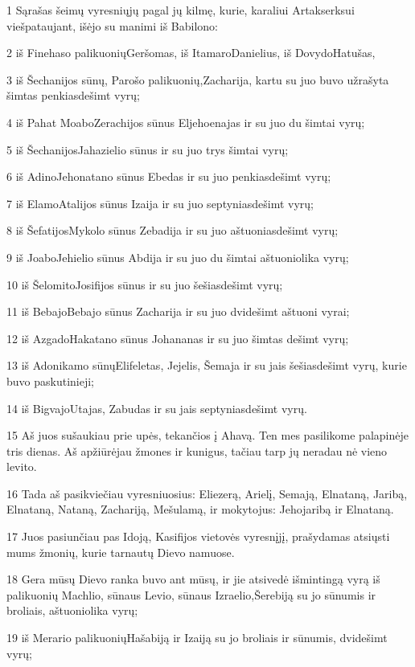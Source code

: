 \par 1 Sąrašas šeimų vyresniųjų pagal jų kilmę, kurie, karaliui Artakserksui viešpataujant, išėjo su manimi iš Babilono: 
\par 2 iš Finehaso palikuonių­Geršomas, iš Itamaro­Danielius, iš Dovydo­Hatušas, 
\par 3 iš Šechanijos sūnų, Parošo palikuonių,­Zacharija, kartu su juo buvo užrašyta šimtas penkiasdešimt vyrų; 
\par 4 iš Pahat Moabo­Zerachijos sūnus Eljehoenajas ir su juo du šimtai vyrų; 
\par 5 iš Šechanijos­Jahazielio sūnus ir su juo trys šimtai vyrų; 
\par 6 iš Adino­Jehonatano sūnus Ebedas ir su juo penkiasdešimt vyrų; 
\par 7 iš Elamo­Atalijos sūnus Izaija ir su juo septyniasdešimt vyrų; 
\par 8 iš Šefatijos­Mykolo sūnus Zebadija ir su juo aštuoniasdešimt vyrų; 
\par 9 iš Joabo­Jehielio sūnus Abdija ir su juo du šimtai aštuoniolika vyrų; 
\par 10 iš Šelomito­Josifijos sūnus ir su juo šešiasdešimt vyrų; 
\par 11 iš Bebajo­Bebajo sūnus Zacharija ir su juo dvidešimt aštuoni vyrai; 
\par 12 iš Azgado­Hakatano sūnus Johananas ir su juo šimtas dešimt vyrų; 
\par 13 iš Adonikamo sūnų­Elifeletas, Jejelis, Šemaja ir su jais šešiasdešimt vyrų, kurie buvo paskutinieji; 
\par 14 iš Bigvajo­Utajas, Zabudas ir su jais septyniasdešimt vyrų. 
\par 15 Aš juos sušaukiau prie upės, tekančios į Ahavą. Ten mes pasilikome palapinėje tris dienas. Aš apžiūrėjau žmones ir kunigus, tačiau tarp jų neradau nė vieno levito. 
\par 16 Tada aš pasikviečiau vyresniuosius: Eliezerą, Arielį, Semają, Elnataną, Jaribą, Elnataną, Nataną, Zachariją, Mešulamą, ir mokytojus: Jehojaribą ir Elnataną. 
\par 17 Juos pasiunčiau pas Idoją, Kasifijos vietovės vyresnįjį, prašydamas atsiųsti mums žmonių, kurie tarnautų Dievo namuose. 
\par 18 Gera mūsų Dievo ranka buvo ant mūsų, ir jie atsivedė išmintingą vyrą iš palikuonių Machlio, sūnaus Levio, sūnaus Izraelio,­Šerebiją su jo sūnumis ir broliais, aštuoniolika vyrų; 
\par 19 iš Merario palikuonių­Hašabiją ir Izaiją su jo broliais ir sūnumis, dvidešimt vyrų; 
